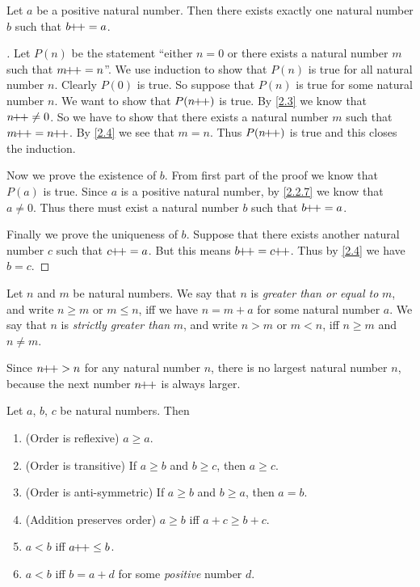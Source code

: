 \begin{lem}\label{2.2.10}
  Let \(a\) be a positive natural number.
  Then there exists exactly one natural number \(b\) such that \(b\!\!+\!\!+ = a\).
\end{lem}

\begin{proof}[]
  Let \(P(n)\) be the statement ``either \(n = 0\) or there exists a natural number \(m\) such that \(m\!\!+\!\!+ = n\)''.
  We use induction to show that \(P(n)\) is true for all natural number \(n\).
  Clearly \(P(0)\) is true.
  So suppose that \(P(n)\) is true for some natural number \(n\).
  We want to show that \(P(n\!\!+\!\!+)\) is true.
  By \cref{2.3} we know that \(n\!\!+\!\!+ \neq 0\).
  So we have to show that there exists a natural number \(m\) such that \(m\pp = n\pp\).
  By \cref{2.4} we see that \(m = n\).
  Thus \(P(n\!\!+\!\!+)\) is true and this closes the induction.

  Now we prove the existence of \(b\).
  From first part of the proof we know that \(P(a)\) is true.
  Since \(a\) is a positive natural number, by \cref{2.2.7} we know that \(a \neq 0\).
  Thus there must exist a natural number \(b\) such that \(b\!\!+\!\!+ = a\).

  Finally we prove the uniqueness of \(b\).
  Suppose that there exists another natural number \(c\) such that \(c\!\!+\!\!+ = a\).
  But this means \(b\pp = c\pp\).
  Thus by \cref{2.4} we have \(b = c\).
\end{proof}

\begin{defn}\label{2.2.11}
  Let \(n\) and \(m\) be natural numbers.
  We say that \(n\) is \emph{greater than or equal to} \(m\), and write \(n \geq m\) or \(m \leq n\), iff we have \(n = m + a\) for some natural number \(a\).
  We say that \(n\) is \emph{strictly greater than} \(m\), and write \(n > m\) or \(m < n\), iff \(n \geq m\) and \(n \neq m\).
\end{defn}

\begin{note}
  Since \(n\!\!+\!\!+ > n\) for any natural number \(n\), there is no largest natural number \(n\), because the next number \(n\!\!+\!\!+\) is always larger.
\end{note}

\begin{prop}\label{2.2.12}
  Let \(a\), \(b\), \(c\) be natural numbers.
  Then
  \begin{enumerate}
    \item (Order is reflexive) \(a \geq a\).
    \item (Order is transitive) If \(a \geq b\) and \(b \geq c\), then \(a \geq c\).
    \item (Order is anti-symmetric) If \(a \geq b\) and \(b \geq a\), then \(a = b\).
    \item (Addition preserves order) \(a \geq b\) iff \(a + c \geq b + c\).
    \item \(a < b\) iff \(a\!\!+\!\!+ \leq b\).
    \item \(a < b\) iff \(b = a + d\) for some \emph{positive} number \(d\).
  \end{enumerate}
\end{prop}

